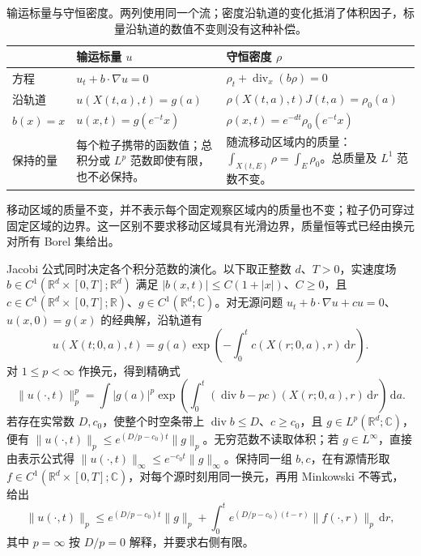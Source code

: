 \begin{table}[htbp]
\centering
\small
\renewcommand{\arraystretch}{1.3}
\caption[输运标量与守恒密度]{输运标量与守恒密度。两列使用同一个流；密度沿轨道的变化抵消了体积因子，标量沿轨道的数值不变则没有这种补偿。}
\label{b2:tab:07-scalar-density}
\begin{tabularx}{\linewidth}{@{}>{\raggedright\arraybackslash}p{1.5cm}>{\raggedright\arraybackslash}X>{\raggedright\arraybackslash}X@{}}
\toprule
 & 输运标量 \(u\) & 守恒密度 \(\rho\) \\
\midrule
方程 & \(u_t+b\cdot\nabla u=0\) & \(\rho_t+\operatorname{div}_x(b\rho)=0\) \\
沿轨道 & \(u(X(t,a),t)=g(a)\) & \(\rho(X(t,a),t)J(t,a)=\rho_0(a)\) \\
\(b(x)=x\) & \(u(x,t)=g(e^{-t}x)\) & \(\rho(x,t)=e^{-dt}\rho_0(e^{-t}x)\) \\
保持的量 & 每个粒子携带的函数值；总积分或 \(L^p\) 范数即使有限，也不必保持。 & 随流移动区域内的质量：\(\int_{X(t,E)}\rho=\int_E\rho_0\)。总质量及 \(L^1\) 范数不变。 \\
\bottomrule
\end{tabularx}
\end{table}

移动区域的质量不变，并不表示每个固定观察区域内的质量也不变；粒子仍可穿过固定区域的边界。这一区别不要求移动区域具有光滑边界，质量恒等式已经由换元对所有 Borel 集给出。

\ProseParagraphBreak

Jacobi 公式同时决定各个积分范数的演化。以下取正整数 \(d\)、\(T>0\)，实速度场 \(b\in C^1(\mathbb R^d\times[0,T];\mathbb R^d)\) 满足 \(|b(x,t)|\leq C(1+|x|)\)、\(C\geq0\)，且 \(c\in C^1(\mathbb R^d\times[0,T];\mathbb R)\)、\(g\in C^1(\mathbb R^d;\mathbb C)\)。对无源问题 \(u_t+b\cdot\nabla u+cu=0\)、\(u(x,0)=g(x)\) 的经典解，沿轨道有
\[
 u(X(t;0,a),t)=g(a)\exp\left(-\int_0^tc(X(r;0,a),r)\,\mathrm{d}r\right).
\]
对 \(1\leq p<\infty\) 作换元，得到精确式
\[
 \|u(\cdot,t)\|_p^p
 =\int |g(a)|^p\exp\left(\int_0^t
   (\operatorname{div}b-pc)(X(r;0,a),r)\,\mathrm{d}r\right)\,\mathrm{d}a.
\]
若存在实常数 \(D,c_0\)，使整个时空条带上 \(\operatorname{div}b\leq D\)、\(c\geq c_0\)，且 \(g\in L^p(\mathbb R^d;\mathbb C)\)，便有 \(\|u(\cdot,t)\|_p\leq e^{(D/p-c_0)t}\|g\|_p\)。无穷范数不读取体积；若 \(g\in L^\infty\)，直接由表示公式得 \(\|u(\cdot,t)\|_\infty\leq e^{-c_0t}\|g\|_\infty\)。保持同一组 \(b,c\)，在有源情形取 \(f\in C^1(\mathbb R^d\times[0,T];\mathbb C)\)，对每个源时刻用同一换元，再用 Minkowski 不等式，给出
\[
 \|u(\cdot,t)\|_p
 \leq e^{(D/p-c_0)t}\|g\|_p
 +\int_0^t e^{(D/p-c_0)(t-r)}\|f(\cdot,r)\|_p\,\mathrm{d}r,
\]
其中 \(p=\infty\) 按 \(D/p=0\) 解释，并要求右侧有限。


